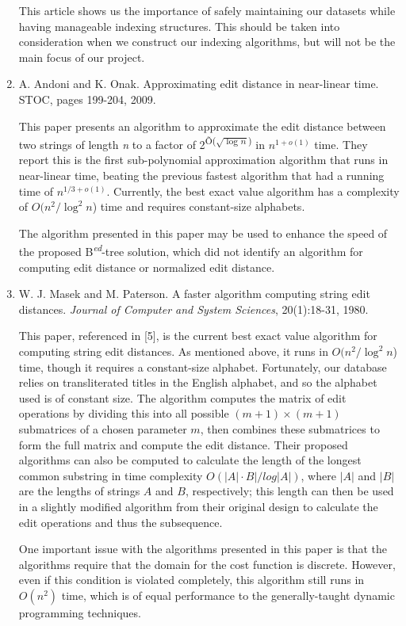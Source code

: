 \documentclass[pdftex,12pt,letter]{article}
\begin{document}
\begin{enumerate}
	This article shows us the importance of safely maintaining our datasets while having manageable indexing structures. This should be taken into consideration when we construct our indexing algorithms, but will not be the main focus of our project. 


\item A. Andoni and K. Onak. Approximating edit distance in near-linear time. STOC, pages 199-204, 2009.

This paper presents an algorithm to approximate the edit distance between two strings of length \textit{n} to a factor of 2\textsuperscript{\~{O}($\sqrt{\log{n}}$)} in $n^{1+o(1)}$ time. They report this is the first sub-polynomial approximation algorithm that runs in near-linear time, beating the previous fastest algorithm that had a running time of $n^{1/3 + o(1)}$. Currently, the best exact value algorithm has a complexity of $O(n^2/\log^2{n}$) time and requires constant-size alphabets.

The algorithm presented in this paper may be used to enhance the speed of the proposed B\textsuperscript{\textit{ed}}-tree solution, which did not identify an algorithm for computing edit distance or normalized edit distance.

\item W. J. Masek and M. Paterson. A faster algorithm computing string edit distances. \textit{Journal of Computer and System Sciences}, 20(1):18-31, 1980.

This paper, referenced in [5], is the current best exact value algorithm for computing string edit distances. As mentioned above, it runs in $O(n^2/\log^2{n}$) time, though it requires a constant-size alphabet. Fortunately, our database relies on transliterated titles in the English alphabet, and so the alphabet used is of constant size. The algorithm computes the matrix of edit operations by dividing this into all possible $(m + 1) \times (m + 1)$ submatrices of a chosen parameter $m$, then combines these submatrices to form the full matrix and compute the edit distance. Their proposed algorithms can also be computed to calculate the length of the longest common substring in time complexity $O(|A| \cdot B|/log{|A|})$, where $|A|$ and $|B|$ are the lengths of strings $A$ and $B$, respectively; this length can then be used in a slightly modified algorithm from their original design to calculate the edit operations and thus the subsequence.

One important issue with the algorithms presented in this paper is that the algorithms require that the domain for the cost function is discrete. However, even if this condition is violated completely, this algorithm still runs in $O(n^2)$ time, which is of equal performance to the generally-taught dynamic programming techniques.


\end{enumerate}
\end{document}
